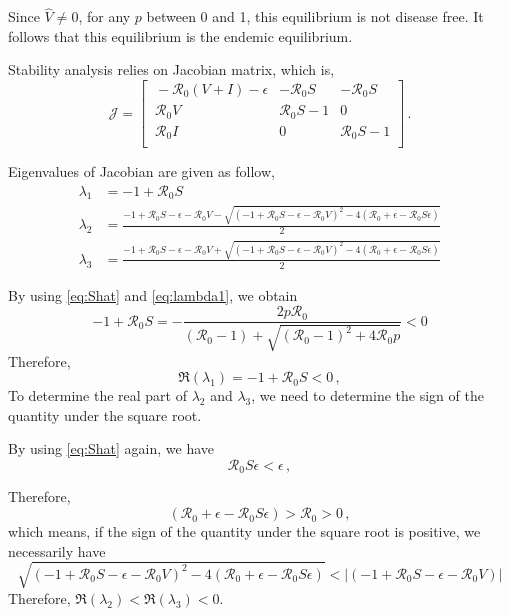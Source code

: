 \documentclass[12pt]{article}
\newcommand{\R}{\mathcal{R}}
\begin{document}
Since $\hat{V}\neq 0$, for any $p$ between 0 and 1, this equilibrium is not disease free. It follows that this equilibrium is the endemic equilibrium.

Stability analysis relies on Jacobian matrix, which is,
\begin{equation}
\mathcal{J} =
\begin{bmatrix}
    \ -\R_0 (V+I)-\epsilon       & -\R_0 S     &-\R_0 S\\
    \ \R_0 V       & \R_0 S-1    &0\\
    \ \R_0 I       &0     &\R_0 S-1\\
\end{bmatrix}\,.
\end{equation}

Eigenvalues of Jacobian are given as follow,
\begin{subequations}
\begin{align}
\lambda_1&=-1+\R_0 S \label{eq:lambda1}\\
\lambda_2&=\frac{-1+\R_0 S-\epsilon-\R_0 V-\sqrt{(-1+\R_0 S-\epsilon-\R_0 V)^2-4(\R_0+\epsilon-\R_0 S\epsilon)}}{2} \label{eq:lambda2}\\
\lambda_3&=\frac{-1+\R_0 S-\epsilon-\R_0 V+\sqrt{(-1+\R_0 S-\epsilon-\R_0 V)^2-4(\R_0+\epsilon-\R_0 S\epsilon)}}{2}\label{eq:lambda3}
\end{align}
\end{subequations}

By using \autoref{eq:Shat} and \autoref{eq:lambda1}, we obtain
\begin{equation}
-1+\R_0 S = - \frac{2p\R_0}{(\R_0 -1)+ \sqrt{(\R_0-1)^2+4\R_0 p}}<0
\end{equation}
Therefore,
\begin{equation}
\Re(\lambda_1) =-1+\R_0 S<0\,,
\end{equation}
To determine the real part of $\lambda_2$ and $\lambda_3$, we need to determine the sign of the quantity under the square root. 

By using \autoref{eq:Shat} again, we have
\begin{equation}
\R_0 S\epsilon<\epsilon\,,
\end{equation}

Therefore,
\begin{equation}
(\R_0+\epsilon-\R_0 S\epsilon)>\R_0 >0\,,
\end{equation}
which means, if the sign of the quantity under the square root is positive, we necessarily have
\begin{equation}
\sqrt{(-1+\R_0 S-\epsilon-\R_0 V)^2-4(\R_0+\epsilon-\R_0 S\epsilon)}<|(-1+\R_0 S-\epsilon-\R_0 V)|
\end{equation}
Therefore, $\Re(\lambda_2)<\Re(\lambda_3)<0$.
\end{document}
